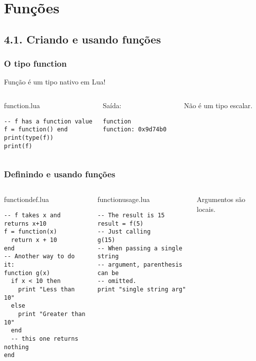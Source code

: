 \documentclass[brazil]{beamer}
\begin{document}
\section{Funções}
\subsection{4.1. Criando e usando funções}
\begin{frame}[fragile]
  \frametitle{O tipo function}
  \pause
  \begin{center}
    Função é um tipo nativo em Lua!
  \end{center}
  \pause
  \begin{columns}
      \begin{block}{function.lua}
        \begin{lstlisting}
-- f has a function value
f = function() end
print(type(f))
print(f)
        \end{lstlisting}
      \end{block}
    \pause
      \begin{block}{Saída:}
        \begin{verbatim}
function
function: 0x9d74b0  \end{verbatim}
      \end{block}
      \pause
      Não é um tipo escalar.
  \end{columns}
\end{frame}
\begin{frame}[fragile]
  \frametitle{Definindo e usando funções}
  \pause
  \begin{columns}
      \begin{block}{functiondef.lua}
        \begin{lstlisting}
-- f takes x and returns x+10
f = function(x)
  return x + 10
end
-- Another way to do it:
function g(x)
  if x < 10 then
    print "Less than 10"
  else
    print "Greater than 10"
  end
  -- this one returns nothing
end
        \end{lstlisting}
      \end{block}
    \pause
      \begin{block}{functionusage.lua}
        \begin{lstlisting}
-- The result is 15
result = f(5)
-- Just calling
g(15)
-- When passing a single string
-- argument, parenthesis can be
-- omitted.
print "single string arg"
        \end{lstlisting}
      \end{block}
      \pause
      Argumentos são locais.
  \end{columns}
\end{frame}
\end{document}
